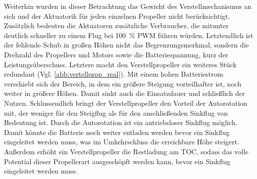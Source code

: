 Weiterhin wurden in dieser Betrachtung das Gewicht des Verstellmechanismus an sich und der Aktuatorik für jeden einzelnen Propeller nicht berücksichtigt. Zusätzlich bedeuten die Aktuatoren zusätzliche Verbraucher, die mitunter deutlich schneller zu einem Flug bei \SI{100}{\%} PWM führen würden. Letztendlich ist der fehlende Schub in großen Höhen nicht das Begrenzungsmerkmal, sondern die Drehzahl des Propellers und Motors sowie die Batteriespannung, kurz der Leistungsüberschuss. Letztere macht den Verstellpropeller ein weiteres Stück redundant (Vgl. \ref{abb:vertellprop_real}). Mit einem hohen Batteriestrom verschiebt sich der Bereich, in dem ein größere Steigung vorteilhafter ist, noch weiter in größere Höhen. Damit sinkt auch die Einsatzdauer und schließlich der Nutzen. 
Schlussendlich bringt der Verstellpropeller den Vorteil der Autorotation mit, der weniger für den Steigflug als für den anschließenden Sinkflug von Bedeutung ist. Durch die Autorotation ist ein antriebsloser Sinkflug möglich. Damit könnte die Batterie noch weiter entladen werden bevor ein Sinkflug eingeleitet werden muss, was im Umkehrschluss die erreichbare Höhe steigert. Außerdem erhöht ein Verstellpropeller die Restladung am TOC, sodass das volle Potential dieser Propellerart ausgeschöpft werden kann, bevor ein Sinkflug eingeleitet werden muss. 

